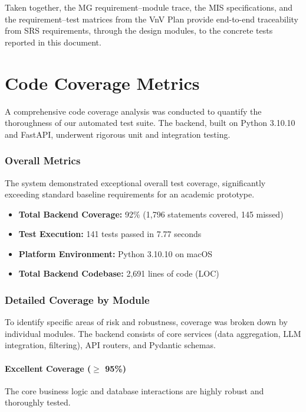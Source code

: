 \documentclass[12pt, titlepage]{article}
\begin{document}
Taken together, the MG requirement--module trace, the MIS specifications, and
the requirement--test matrices from the VnV Plan provide end-to-end
traceability from SRS requirements, through the design modules, to the concrete
tests reported in this document.

\section{Code Coverage Metrics}
\label{sec:code_coverage}

A comprehensive code coverage analysis was conducted to quantify the thoroughness of our automated test suite. The backend, built on Python 3.10.10 and FastAPI, underwent rigorous unit and integration testing. 

\subsubsection{Overall Metrics}
The system demonstrated exceptional overall test coverage, significantly exceeding standard baseline requirements for an academic prototype. 



\begin{itemize}
    \item \textbf{Total Backend Coverage:} 92\% (1,796 statements covered, 145 missed)
    \item \textbf{Test Execution:} 141 tests passed in 7.77 seconds
    \item \textbf{Platform Environment:} Python 3.10.10 on macOS
    \item \textbf{Total Backend Codebase:} 2,691 lines of code (LOC)
\end{itemize}

\subsubsection{Detailed Coverage by Module}
To identify specific areas of risk and robustness, coverage was broken down by individual modules. The backend consists of core services (data aggregation, LLM integration, filtering), API routers, and Pydantic schemas.



\paragraph{Excellent Coverage ($\ge$ 95\%)}
The core business logic and database interactions are highly robust and thoroughly tested.
\end{document}
